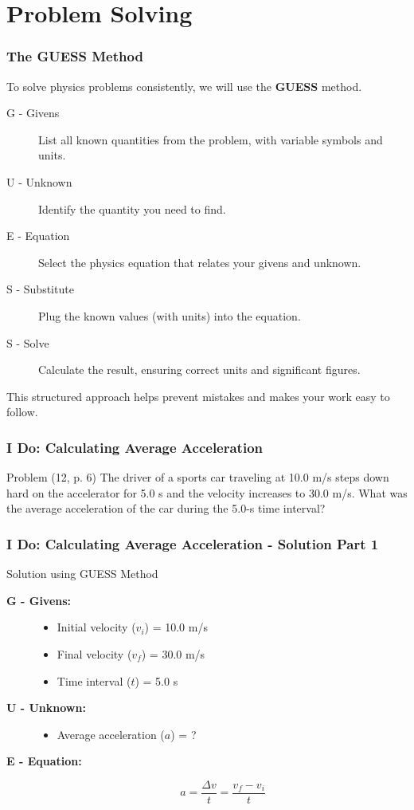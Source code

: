 \documentclass{beamer}
\begin{document}
\section{Problem Solving}

\begin{frame}
\frametitle{The GUESS Method}
To solve physics problems consistently, we will use the \textbf{GUESS} method.
\pause
\begin{description}
    \item[\alert{G} - Givens] List all known quantities from the problem, with variable symbols and units.
    \pause
    \item[\alert{U} - Unknown] Identify the quantity you need to find.
    \pause
    \item[\alert{E} - Equation] Select the physics equation that relates your givens and unknown.
    \pause
    \item[\alert{S} - Substitute] Plug the known values (with units) into the equation.
    \pause
    \item[\alert{S} - Solve] Calculate the result, ensuring correct units and significant figures.
\end{description}
\pause
This structured approach helps prevent mistakes and makes your work easy to follow.
\end{frame}

\begin{frame}
\frametitle{I Do: Calculating Average Acceleration}
\begin{block}{Problem (12, p. 6)}
The driver of a sports car traveling at 10.0 m/s steps down hard on the accelerator for 5.0 s and the velocity increases to 30.0 m/s. What was the average acceleration of the car during the 5.0-s time interval?
\end{block}
\end{frame}

\begin{frame}
\frametitle{I Do: Calculating Average Acceleration - Solution Part 1}
\begin{block}{Solution using GUESS Method}
\begin{description}
    \item[\textbf{G - Givens:}]
        \begin{itemize}
            \item Initial velocity ($v_i$) = 10.0 m/s
            \item Final velocity ($v_f$) = 30.0 m/s
            \item Time interval ($t$) = 5.0 s
        \end{itemize}
    \item[\textbf{U - Unknown:}]
        \begin{itemize}
            \item Average acceleration ($a$) = ?
        \end{itemize}
    \item[\textbf{E - Equation:}]
        \[ a = \frac{\Delta v}{t} = \frac{v_f - v_i}{t} \]
\end{description}
\end{block}
\end{frame}
\end{document}
